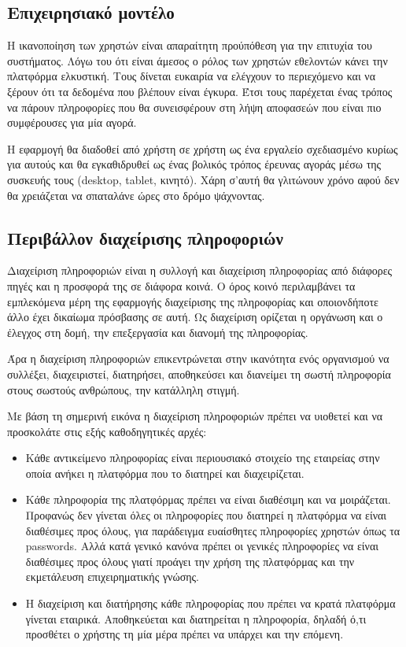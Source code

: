 \documentclass[12pt, oneside, a4paper]{report}
\begin{document}
\subsection{Επιχειρησιακό μοντέλο}

\hspace{0.6cm}Η ικανοποίηση των χρηστών είναι απαραίτητη προύπόθεση για την επιτυχία του συστήματος.
Λόγω του ότι είναι άμεσος ο ρόλος των χρηστών εθελοντών κάνει την πλατφόρμα ελκυστική. Τους δίνεται ευκαιρία να ελέγχουν το περιεχόμενο και να ξέρουν ότι τα δεδομένα που βλέπουν είναι έγκυρα. Έτσι τους παρέχεται ένας τρόπος να πάρουν πληροφορίες που θα συνεισφέρουν στη λήψη αποφασεών που είναι πιο συμφέρουσες για μία αγορά. 

\hspace{0.6cm}Η εφαρμογή θα διαδοθεί από χρήστη σε χρήστη ως ένα εργαλείο σχεδιασμένο κυρίως για αυτούς και θα εγκαθιδρυθεί ως ένας βολικός τρόπος έρευνας αγοράς μέσω της συσκευής τους (desktop, tablet, κινητό). Χάρη σ'αυτή θα γλιτώνουν χρόνο αφού δεν θα χρειάζεται να σπαταλάνε ώρες στο δρόμο ψάχνοντας.

\subsection{Περιβάλλον διαχείρισης πληροφοριών}
\hspace{0.6cm}Διαχείριση πληροφοριών είναι η συλλογή και διαχείριση πληροφορίας από διάφορες πηγές και η προσφορά της σε διάφορα κοινά. Ο όρος κοινό περιλαμβάνει τα εμπλεκόμενα μέρη της εφαρμογής διαχείρισης της πληροφορίας και οποιονδήποτε άλλο έχει δικαίωμα πρόσβασης σε αυτή. Ως διαχείριση ορίζεται η οργάνωση και ο έλεγχος στη δομή, την επεξεργασία και διανομή της πληροφορίας.

\hspace{0.6cm}Άρα η διαχείριση πληροφοριών επικεντρώνεται στην ικανότητα ενός οργανισμού να συλλέξει, διαχειριστεί, διατηρήσει, αποθηκεύσει και διανείμει τη σωστή πληροφορία στους σωστούς ανθρώπους, την κατάλληλη στιγμή.

\hspace{0.6cm}Με βάση τη σημερινή εικόνα η διαχείριση πληροφοριών πρέπει να υιοθετεί και να προσκολάτε στις εξής καθοδηγητικές αρχές:
\begin{itemize}
 \item Κάθε αντικείμενο πληροφορίας είναι περιουσιακό στοιχείο της εταιρείας στην οποία ανήκει η πλατφόρμα που το διατηρεί και διαχειρίζεται.
 \item Κάθε πληροφορία της πλατφόρμας πρέπει να είναι διαθέσιμη και να μοιράζεται. Προφανώς δεν γίνεται όλες οι πληροφορίες που διατηρεί η πλατφόρμα να είναι διαθέσιμες προς όλους, για παράδειγμα ευαίσθητες πληροφορίες χρηστών όπως τα passwords. Αλλά κατά γενικό κανόνα πρέπει οι γενικές πληροφορίες να είναι διαθέσιμες προς όλους γιατί προάγει την χρήση της πλατφόρμας και την εκμετάλευση επιχειρηματικής γνώσης.
 \item Η διαχείριση και διατήρησης κάθε πληροφορίας που πρέπει να κρατά πλατφόρμα γίνεται εταιρικά. Αποθηκεύεται και διατηρείται η πληροφορία, δηλαδή ό,τι προσθέτει ο χρήστης τη μία μέρα πρέπει να υπάρχει και την επόμενη.
\end{itemize}
\end{document}
